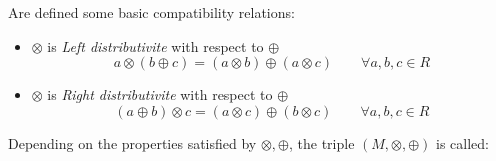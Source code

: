 \documentclass[a4paper,12pt]{scrartcl}    %
\newcommand{\OpA}{\otimes}
\newcommand{\OpB}{\oplus}
\begin{document}
Are defined some basic compatibility relations:
\begin{itemize}
\item $\OpA$ is \emph{Left distributivite} with respect to $\OpB$
	\begin{equation}\label{LeftDistributivity}
		a \OpA ( b \OpB c) = (a \OpA b) \OpB (a \OpA c) \qquad \forall a,b,c \in R
	\end{equation}
\item  $\OpA$ is \emph{Right distributivite} with respect to $\OpB$
	\begin{equation}\label{RightDistributivity}
		( a \OpB b)\OpA c = (a \OpA c) \OpB (b \OpA c) \qquad \forall a,b,c \in R	
	\end{equation}
\end{itemize}

Depending on the properties satisfied by $\OpA,\OpB$, the triple $(M,\OpA,\OpB)$ is called:
\end{document}
